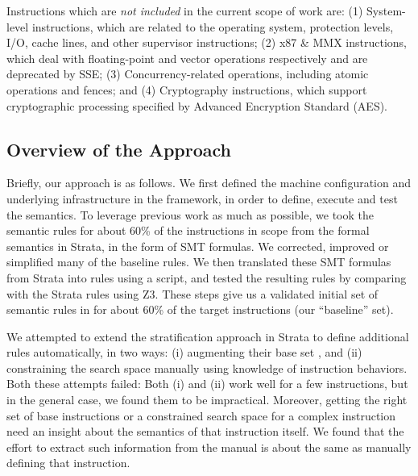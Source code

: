 Instructions which are \emph{not included} in the current scope of work are: 
(1) System-level instructions, which are related to the operating system, 
protection levels, I/O, cache lines, and other supervisor instructions; 
(2) x87 \& MMX instructions, which deal with floating-point and vector 
operations respectively and are deprecated by SSE; 
(3) Concurrency-related operations, including atomic operations and fences; and 
(4) Cryptography instructions, which support cryptographic processing specified by Advanced Encryption Standard (AES).

\subsection{Overview of the Approach}
\label{sec:Approach:Overview}

Briefly, our approach is as follows.
%
We first defined the machine configuration and underlying infrastructure in the \K framework, in order to define, execute and test the \ISA semantics.
%
To leverage previous work as much as possible, we took the semantic rules for about 60\% of the instructions in scope from the formal semantics in Strata, in the form of SMT formulas.
%
We corrected, improved or simplified many of the baseline rules.
%
We then translated these SMT formulas from Strata into \K rules using a script, and tested the resulting rules by comparing with the Strata rules using Z3.
%
These steps give us a validated initial set of semantic rules in \K for about 60\% of the target instructions (our ``baseline'' set).

We attempted to extend the stratification approach in Strata to define additional rules automatically, in two ways: (i) augmenting their base set , and (ii) constraining the search space manually using knowledge of instruction behaviors.  Both these attempts failed: Both (i) and (ii) work well for a few instructions, but in the general case, we found them to be impractical.  Moreover, getting the right set of base instructions or a constrained search space for a complex instruction need an insight about the semantics of that instruction itself. We found that the effort to extract such information from the manual is about the same  as manually defining that instruction. 
 

